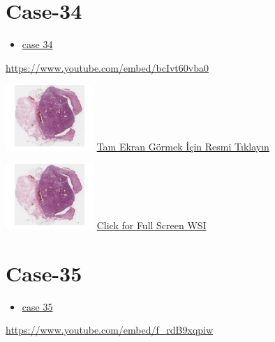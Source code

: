 \documentclass[
  letterpaper,
  paper=6in:9in,
  pagesize=pdftex,
  headinclude=on,
  footinclude=on,
  12pt]{scrbook}
\providecommand{\tightlist}{%
  \setlength{\itemsep}{0pt}\setlength{\parskip}{0pt}}\usepackage{longtable,booktabs,array}
\begin{document}
\hypertarget{sec-hacettepe-case-of-the-month-case-34}{%
\section{Case-34}\label{sec-hacettepe-case-of-the-month-case-34}}

\begin{itemize}
\tightlist
\item
  \href{https://www.youtube.com/watch?v=bcIvt60vba0\&ab_channel=KemalKosemehmetoglu}{case
  34}
\end{itemize}

\url{https://www.youtube.com/embed/bcIvt60vba0}

\href{https://images.patolojiatlasi.com/hacettepe-com-case-1/HE.html}{\includegraphics[width=0.25\textwidth,height=\textheight]{./screenshots/hacettepe-com-case-1_screenshot.png}}
\href{https://images.patolojiatlasi.com/hacettepe-com-case-/HE.html}{Tam
Ekran Görmek İçin Resmi Tıklayın}

\href{https://images.patolojiatlasi.com/hacettepe-com-case-1/HE.html}{\includegraphics[width=0.25\textwidth,height=\textheight]{./screenshots/hacettepe-com-case-1_screenshot.png}}
\href{https://images.patolojiatlasi.com/hacettepe-com-case-/HE.html}{Click
for Full Screen WSI}

\hypertarget{sec-hacettepe-case-of-the-month-case-35}{%
\section{Case-35}\label{sec-hacettepe-case-of-the-month-case-35}}

\begin{itemize}
\tightlist
\item
  \href{https://www.youtube.com/watch?v=f_rdB9xqpiw\&ab_channel=KemalKosemehmetoglu}{case
  35}
\end{itemize}

\url{https://www.youtube.com/embed/f_rdB9xqpiw}
\end{document}
